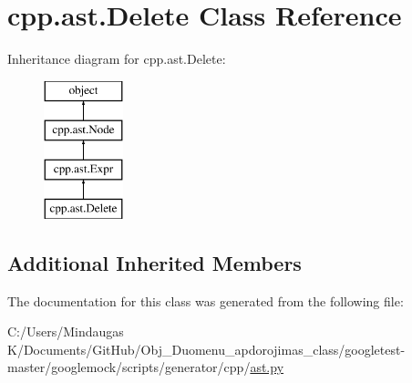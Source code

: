 \hypertarget{classcpp_1_1ast_1_1_delete}{}\section{cpp.\+ast.\+Delete Class Reference}
\label{classcpp_1_1ast_1_1_delete}
Inheritance diagram for cpp.\+ast.\+Delete\+:\begin{figure}[H]
\begin{center}
\leavevmode
\includegraphics[height=4.000000cm]{db/d87/classcpp_1_1ast_1_1_delete}
\end{center}
\end{figure}
\subsection*{Additional Inherited Members}


The documentation for this class was generated from the following file\+:\begin{DoxyCompactItemize}
\item 
C\+:/\+Users/\+Mindaugas K/\+Documents/\+Git\+Hub/\+Obj\+\_\+\+Duomenu\+\_\+apdorojimas\+\_\+class/googletest-\/master/googlemock/scripts/generator/cpp/\mbox{\hyperlink{googletest-master_2googlemock_2scripts_2generator_2cpp_2ast_8py}{ast.\+py}}\end{DoxyCompactItemize}
